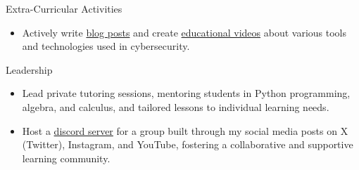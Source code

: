 \documentclass{resume} %
\begin{document}
\begin{rSection}{Extra-Curricular Activities} 
    \begin{itemize}
        \item Actively write \href{https://gutibran.com/blog}{blog posts} and create \href{https://youtube.com/@gutibran}{educational videos} about various tools and technologies used in cybersecurity.
    \end{itemize}
\end{rSection}

\begin{rSection}{Leadership} 
    \begin{itemize}
        \itemsep -3pt {} 
        \item Lead private tutoring sessions, mentoring students in Python programming, algebra, and calculus, and tailored lessons to individual learning needs.
        \item Host a \href{https://discord.com}{discord server} for a group built through my social media posts on X (Twitter), Instagram, and YouTube, fostering a collaborative and supportive learning community.
    \end{itemize}
\end{rSection}
\end{document}
